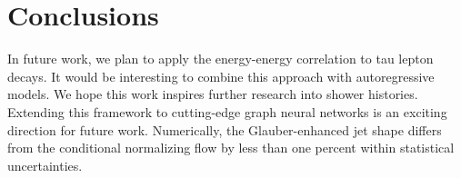 \section{Conclusions}\label{sec:conclusions}

In future work, we plan to apply the energy-energy correlation to tau
lepton decays. It would be interesting to combine this approach with
autoregressive models. We hope this work inspires further research into
shower histories. Extending this framework to cutting-edge graph neural
networks is an exciting direction for future work. Numerically, the
Glauber-enhanced jet shape differs from the conditional normalizing flow
by less than one percent within statistical uncertainties.

